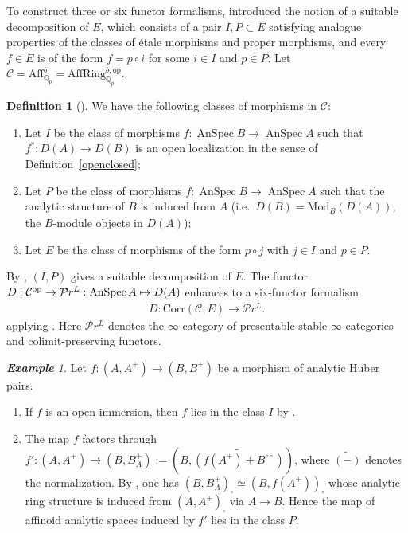 \documentclass[a4paper,10pt]{amsart}
\theoremstyle{remark}
\newtheorem{example}[theorem]{\bf Example}
\theoremstyle{definition}
\newtheorem{definition}[theorem]{Definition}
\theoremstyle{plain}
\numberwithin{equation}{section}
\newcommand{\bbQ}{{\mathbb Q}}
\newcommand{\calC}{{\mathcal C}}
\newcommand{\AffQp}{{\mathrm{Aff}^b_{\mathbb{Q}_p}}}
\DeclareMathOperator{\AnSpec}{AnSpec}
\begin{document}
To construct three or six functor formalisms, \cite[Def.~A.5.9]{mann2022p} introduced the notion of a suitable decomposition of $E$, which consists of a pair $I,P\subset E$ satisfying analogue properties of the classes of \'etale morphisms and proper morphisms, and every $f\in E$ is of the form $f=p\circ i$ for some $i\in I$ and $p\in P$. Let $\calC=\AffQp=\mathrm{AffRing}_{\bbQ_p}^{b,\mathrm{op}}$. 
\begin{definition}[{\cite[Def.~3.2.2]{camargo2024analytic}}]\label{definitionsuitabledecomposition}
	We have the following classes of morphisms in $\calC$:
	\begin{enumerate}
		\item Let $I$ be the class of morphisms $f:\AnSpec B\to \AnSpec A$ such that $f^*:D(A)\to D(B)$ is an open localization in the sense of Definition~\ref{openclosed};
		\item Let $P$ be the class of morphisms $f:\AnSpec B\to \AnSpec A$ such that the analytic structure of $B$ is induced from $A$ (i.e.\ $D(B)=\mathrm{Mod}_{\underline{B}}(D(A))$, the $\underline{B}$-module objects in $D(A)$);
		\item Let $E$ be the class of morphisms of the form $p\circ j$ with $j\in I$ and $p\in P$.
	\end{enumerate}
\end{definition}
By \cite[Lem.~3.2.5]{camargo2024analytic}, $(I,P)$ gives a suitable decomposition of $E$. The functor $D:\calC^{\rm op}\to\mathcal{P}r^L:\AnSpec A\mapsto D(A)$ enhances to a six-functor formalism
\begin{align}\label{equationsixfunctorformalismaffinoid}
	D:\mathrm{Corr}(\calC,E)\to\mathcal{P}r^L.
\end{align}
applying \cite[Prop.~A.5.10]{mann2022p}. Here $\mathcal{P}r^L$ denotes the $\infty$-category of presentable stable $\infty$-categories  and colimit-preserving functors.
\begin{example}\label{examplecanonicalcompactifications}
	Let $f:(A,A^+)\rightarrow  (B,B^+)$ be a morphism of analytic Huber pairs. 
	\begin{enumerate}
		\item If $f$ is an open immersion, then $f$ lies in the class $I$ by \cite[Prop.~2.3.2]{camargo2024analytic}.
		\item The map $f$ factors through $f':(A,A^+)\rightarrow (B,B^+_A):=(B,\widetilde{(f(A^+)+B^{\circ\circ})})$, where $\widetilde{(-)}$ denotes the normalization. By \cite[Prop.~3.32]{andreychev2021pseudocoherent}, one has $(B,B^+_A)_{\square}\simeq (B,f(A^+))_{\square}$ whose analytic ring structure is induced from $(A,A^+)_{\square}$ via $A\rightarrow B$. Hence the map of affinoid analytic spaces induced by $f'$ lies in the class $P$.
	\end{enumerate}
\end{example}
\end{document}
